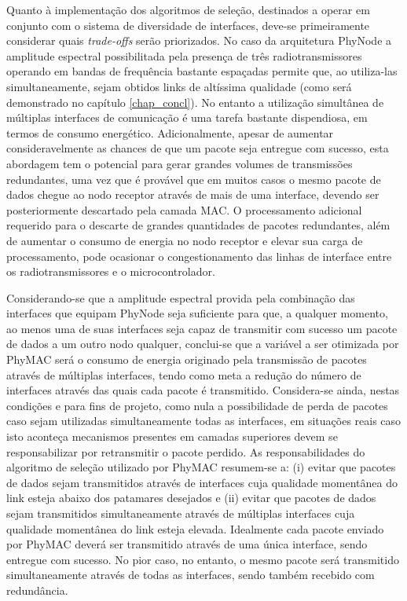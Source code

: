 \documentclass[
	12pt,				%
	openright,			%
	oneside,
	a4paper,			%
	english,			%
	french,				%
	spanish,			%
	brazil				%
	]{abntex2}
\begin{document}
Quanto à implementação dos algoritmos de seleção, destinados a operar em conjunto com o sistema de diversidade de interfaces, deve-se primeiramente considerar quais \textit{trade-offs} serão priorizados. No caso da arquitetura PhyNode a amplitude espectral possibilitada pela presença de três radiotransmissores operando em bandas de frequência bastante espaçadas permite que, ao utiliza-las simultaneamente, sejam obtidos links de altíssima qualidade (como será demonstrado no capítulo \ref{chap_concl}). No entanto a utilização simultânea de múltiplas interfaces de comunicação é uma tarefa bastante dispendiosa, em termos de consumo energético. Adicionalmente, apesar de aumentar consideravelmente as chances de que um pacote seja entregue com sucesso, esta abordagem tem o potencial para gerar grandes volumes de transmissões redundantes, uma vez que é provável que em muitos casos o mesmo pacote de dados chegue ao nodo receptor através de mais de uma interface, devendo ser posteriormente descartado pela camada MAC. O processamento adicional requerido para o descarte de grandes quantidades de pacotes redundantes, além de aumentar o consumo de energia no nodo receptor e elevar sua carga de processamento, pode ocasionar o congestionamento das linhas de interface entre os radiotransmissores e o microcontrolador.

Considerando-se que a amplitude espectral provida pela combinação das interfaces que equipam PhyNode seja suficiente para que, a qualquer momento, ao menos uma de suas interfaces seja capaz de transmitir com sucesso um pacote de dados a um outro nodo qualquer, conclui-se que a variável a ser otimizada por PhyMAC será o consumo de energia originado pela transmissão de pacotes através de múltiplas interfaces, tendo como meta a redução do número de interfaces através das quais cada pacote é transmitido. Considera-se ainda, nestas condições e para fins de projeto, como nula a possibilidade de perda de pacotes caso sejam utilizadas simultaneamente todas as interfaces, em situações reais caso isto aconteça mecanismos presentes em camadas superiores devem se responsabilizar por retransmitir o pacote perdido. As responsabilidades do algoritmo de seleção utilizado por PhyMAC resumem-se a: (i) evitar que pacotes de dados sejam transmitidos através de interfaces cuja qualidade momentânea do link esteja abaixo dos patamares desejados e (ii) evitar que pacotes de dados sejam transmitidos simultaneamente através de múltiplas interfaces cuja qualidade momentânea do link esteja elevada. Idealmente cada pacote enviado por PhyMAC deverá ser transmitido através de uma única interface, sendo entregue com sucesso. No pior caso, no entanto, o mesmo pacote será transmitido simultaneamente através de todas as interfaces, sendo também recebido com redundância.
\end{document}
